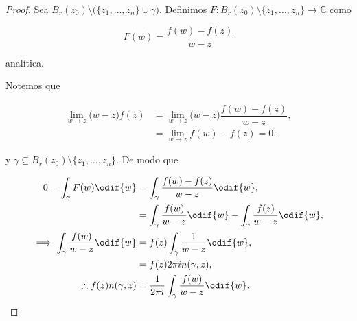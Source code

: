 \documentclass[../main.tex]{subfiles}
\begin{document}
\begin{proof}
    Sea \(B_{r}(z_{0})\setminus \bigl(\bigl\lbrace z_{1},\dots,z_{n} \bigr\rbrace\cup
    \gamma\bigr)\). Definimos \(F \colon B_{r}(z_{0})\setminus \bigl\lbrace
    z_{1},\dots,z_{n} \bigr\rbrace \to \mathbb{C}\) como

    \begin{equation*}
        F(w) = \dfrac{f(w) - f(z)}{w - z}
    \end{equation*}

    analítica.

    Notemos que

    \begin{align*}
        \lim_{w \to z} \bigl(w - z\bigr)f(z) &= \lim_{w \to z} \bigl(w -
        z\bigr)\dfrac{f(w) -
        f(z)}{w - z},\\
        &= \lim_{w \to z} f(w) - f(z) = 0.
    \end{align*}

    y \(\gamma \subseteq B_{r}(z_{0})\setminus \bigl\lbrace z_{1},\dots,z_{n}
    \bigr\rbrace\). De modo que

    \begin{align*}
        0 = \int_{\gamma}^{}F(w)\odif{w} &= \int_{\gamma}^{}\dfrac{f(w) - f(z)}{w -
        z}\odif{w},\\
        &= \int_{\gamma}^{}\dfrac{f(w)}{w - z}\odif{w} -
        \int_{\gamma}^{}\dfrac{f(z)}{w -
        z}\odif{w},\\
        \implies \int_{\gamma}^{}\dfrac{f(w)}{w - z}\odif{w} &= f(z)
        \int_{\gamma}^{}\dfrac{1}{w - z}\odif{w},\\
        &= f(z)2\pi i n(\gamma, z),\\
        \therefore f(z)n(\gamma, z) &= \dfrac{1}{2\pi i}\int_{\gamma}^{}\dfrac{f(w)}{w -
        z}\odif{w}.
    \end{align*}
\end{proof}
\end{document}
